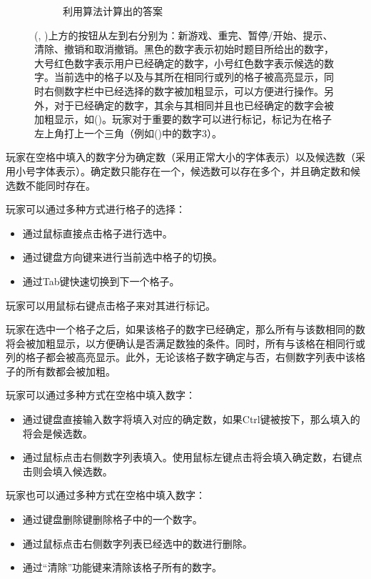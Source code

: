 \documentclass[11pt,a4paper]{article}
\begin{document}
\begin{figure}[H]
\begin{subfigure}{.45\textwidth}
		\caption{利用算法计算出的答案} \label{fig:sudoku-4d}
	\end{subfigure}
	\caption{(, )上方的按钮从左到右分别为：新游戏、重完、暂停/开始、提示、清除、撤销和取消撤销。黑色的数字表示初始时题目所给出的数字，大号红色数字表示用户已经确定的数字，小号红色数字表示候选的数字。当前选中的格子以及与其所在相同行或列的格子被高亮显示，同时右侧数字栏中已经选择的数字被加粗显示，可以方便进行操作。另外，对于已经确定的数字，其余与其相同并且也已经确定的数字会被加粗显示，如()。玩家对于重要的数字可以进行标记，标记为在格子左上角打上一个三角（例如()中的数字3）。}
\end{figure}

玩家在空格中填入的数字分为确定数（采用正常大小的字体表示）以及候选数（采用小号字体表示）。确定数只能存在一个，候选数可以存在多个，并且确定数和候选数不能同时存在。

玩家可以通过多种方式进行格子的选择：
\begin{itemize}
	\item 通过鼠标直接点击格子进行选中。
	\item 通过键盘方向键来进行当前选中格子的切换。
	\item 通过Tab键快速切换到下一个格子。
\end{itemize}

玩家可以用鼠标右键点击格子来对其进行标记。

玩家在选中一个格子之后，如果该格子的数字已经确定，那么所有与该数相同的数将会被加粗显示，以方便确认是否满足数独的条件。同时，所有与该格在相同行或列的格子都会被高亮显示。此外，无论该格子数字确定与否，右侧数字列表中该格子的所有数都会被加粗。

玩家可以通过多种方式在空格中填入数字：
\begin{itemize}
	\item 通过键盘直接输入数字将填入对应的确定数，如果Ctrl键被按下，那么填入的将会是候选数。
	\item 通过鼠标点击右侧数字列表填入。使用鼠标左键点击将会填入确定数，右键点击则会填入候选数。
\end{itemize}

玩家也可以通过多种方式在空格中填入数字：
\begin{itemize}
	\item 通过键盘删除键删除格子中的一个数字。
	\item 通过鼠标点击右侧数字列表已经选中的数进行删除。
	\item 通过“清除”功能键来清除该格子所有的数字。
\end{itemize}
\end{document}
